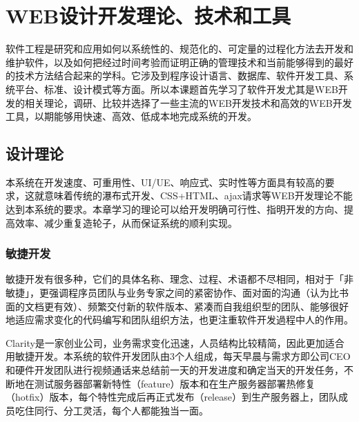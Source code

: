 
\chapter{WEB设计开发理论、技术和工具}
\label{chap:web_dev}
软件工程是研究和应用如何以系统性的、规范化的、可定量的过程化方法去开发和维护软件\supercite{radatz1990ieee}，以及如何把经过时间考验而证明正确的管理技术和当前能够得到的最好的技术方法结合起来的学科。它涉及到程序设计语言、数据库、软件开发工具、系统平台、标准、设计模式等方面。所以本课题首先学习了软件开发尤其是WEB开发的相关理论，调研、比较并选择了一些主流的WEB开发技术和高效的WEB开发工具，以期能够用快速、高效、低成本地完成系统的开发。
\section{设计理论}
本系统在开发速度、可重用性、UI/UE、响应式、实时性等方面具有较高的要求，这就意味着传统的瀑布式开发、CSS+HTML、ajax请求等WEB开发理论不能达到本系统的要求。本章学习的理论可以给开发明确可行性、指明开发的方向、提高效率、减少重复造轮子，从而保证系统的顺利实现。
\subsection{敏捷开发}
敏捷开发有很多种，它们的具体名称、理念、过程、术语都不尽相同，相对于「非敏捷」，更强调程序员团队与业务专家之间的紧密协作、面对面的沟通（认为比书面的文档更有效）、频繁交付新的软件版本、紧凑而自我组织型的团队、能够很好地适应需求变化的代码编写和团队组织方法，也更注重软件开发過程中人的作用。\supercite{beck2013agile}

Clarity是一家创业公司，业务需求变化迅速，人员结构比较精简，因此更加适合用敏捷开发。本系统的软件开发团队由3个人组成，每天早晨与需求方即公司CEO和硬件开发团队进行视频通话来总结前一天的开发进度和确定当天的开发任务，不断地在测试服务器部署新特性（feature）版本和在生产服务器部署热修复（hotfix）版本，每个特性完成后再正式发布（release）到生产服务器上，团队成员吃住同行、分工灵活，每个人都能独当一面。
